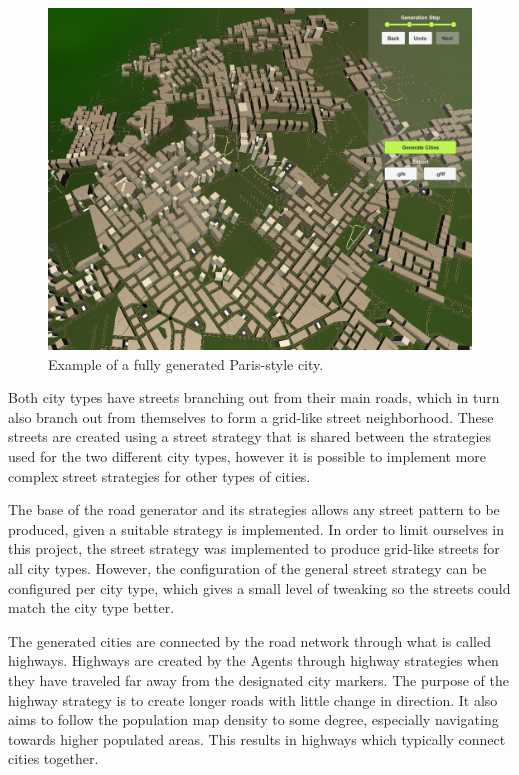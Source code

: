 \begin{figure}[H]
\begin{minipage}[b]{.49\textwidth}
\begin{minipage}[b]{.9\textwidth}
      \includegraphics[width=\textwidth]{figure/results/city_paris.png}
      \caption{Example of a fully generated Paris-style city.}
      \label{fig:results_city_paris}
    \end{minipage}
  \end{minipage}
\end{figure}

Both city types have streets branching out from their main roads, which in turn also branch out from themselves to form a grid-like street neighborhood.
These streets are created using a street strategy that is shared between the strategies used for the two different city types, however it is possible to implement more complex street strategies for other types of cities.

The base of the road generator and its strategies allows any street pattern to be produced, given a suitable strategy is implemented.
In order to limit ourselves in this project, the street strategy was implemented to produce grid-like streets for all city types.
However, the configuration of the general street strategy can be configured per city type, which gives a small level of tweaking so the streets could match the city type better.

The generated cities are connected by the road network through what is called highways.
Highways are created by the Agents through highway strategies when they have traveled far away from the designated city markers.
The purpose of the highway strategy is to create longer roads with little change in direction.
It also aims to follow the population map density to some degree, especially navigating towards higher populated areas.
This results in highways which typically connect cities together.

